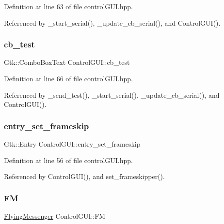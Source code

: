 Definition at line 63 of file control\+G\+U\+I.\+hpp.



Referenced by \+\_\+start\+\_\+serial(), \+\_\+update\+\_\+cb\+\_\+serial(), and Control\+G\+U\+I().

\mbox{\label{class_control_g_u_i_a93ab5972cf38d2cf8431cb375abc56e6}} 
\subsubsection{\texorpdfstring{cb\+\_\+test}{cb\_test}}
{\footnotesize\ttfamily Gtk\+::\+Combo\+Box\+Text Control\+G\+U\+I\+::cb\+\_\+test}



Definition at line 66 of file control\+G\+U\+I.\+hpp.



Referenced by \+\_\+send\+\_\+test(), \+\_\+start\+\_\+serial(), \+\_\+update\+\_\+cb\+\_\+serial(), and Control\+G\+U\+I().

\mbox{\label{class_control_g_u_i_a108e4158252832d9f53570b9c21b8ced}} 
\subsubsection{\texorpdfstring{entry\+\_\+set\+\_\+frameskip}{entry\_set\_frameskip}}
{\footnotesize\ttfamily Gtk\+::\+Entry Control\+G\+U\+I\+::entry\+\_\+set\+\_\+frameskip}



Definition at line 56 of file control\+G\+U\+I.\+hpp.



Referenced by Control\+G\+U\+I(), and set\+\_\+frameskipper().

\mbox{\label{class_control_g_u_i_a16612b604257a888faac7a1d7e9e3e51}} 
\subsubsection{\texorpdfstring{FM}{FM}}
{\footnotesize\ttfamily \hyperlink{class_flying_messenger}{Flying\+Messenger} Control\+G\+U\+I\+::\+FM}



